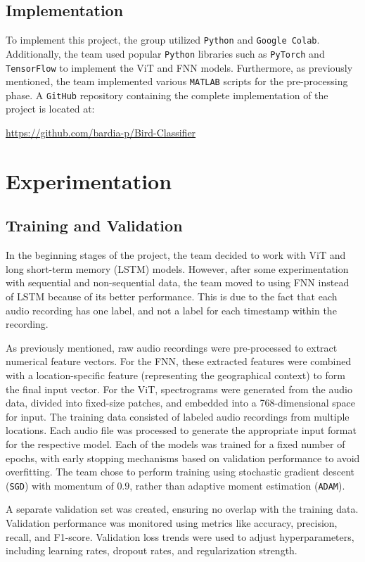 \documentclass[12pt, conference]{IEEEtran}
\begin{document}
\subsection{Implementation}
To implement this project, the group utilized \texttt{Python} and \texttt{Google Colab}. Additionally, the team used popular \texttt{Python} libraries such as \texttt{PyTorch} and \texttt{TensorFlow} to implement the ViT and FNN models. Furthermore, as previously mentioned, the team implemented various \texttt{MATLAB} scripts for the pre-processing phase. A \texttt{GitHub} repository containing the complete implementation of the project is located at:

\url{https://github.com/bardia-p/Bird-Classifier}

\section{Experimentation}
\subsection{Training and Validation}
In the beginning stages of the project, the team decided to work with ViT and long short-term memory (LSTM) models. However, after some experimentation with sequential and non-sequential data, the team moved to using FNN instead of LSTM because of its better performance. This is due to the fact that each audio recording has one label, and not a label for each timestamp within the recording.  

As previously mentioned, raw audio recordings were pre-processed to extract numerical feature vectors. For the FNN, these extracted features were combined with a location-specific feature (representing the geographical context) to form the final input vector. For the ViT, spectrograms were generated from the audio data, divided into fixed-size patches, and embedded into a 768-dimensional space for input. The training data consisted of labeled audio recordings from multiple locations. Each audio file was processed to generate the appropriate input format for the respective model. Each of the models was trained for a fixed number of epochs, with early stopping mechanisms based on validation performance to avoid overfitting. The team chose to perform training using stochastic gradient descent (\texttt{SGD}) with momentum of $0.9$, rather than adaptive moment estimation (\texttt{ADAM}).

A separate validation set was created, ensuring no overlap with the training data. Validation performance was monitored using metrics like accuracy, precision, recall, and F1-score. Validation loss trends were used to adjust hyperparameters, including learning rates, dropout rates, and regularization strength.
\end{document}

